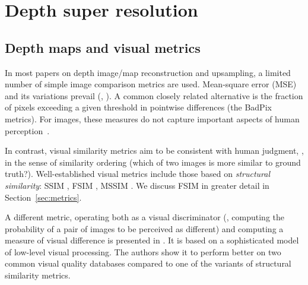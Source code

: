\section{Depth super resolution}
\label{sec:related}

\subsection{Depth maps and visual metrics}

In most papers on depth image/map reconstruction and upsampling, a limited number of simple image comparison metrics are used.  Mean-square error (MSE) and its variations prevail (\eg, \cite{eigen2014depth,honauer2015hci, honauer2016dataset,honauer2016benchmark}). A common closely related alternative is the fraction of pixels exceeding a given threshold in pointwise differences (the BadPix metrics). For images, these measures do not capture important aspects of human perception~\cite{wang2009mean}.

In contrast, visual similarity metrics aim to be consistent with human judgment, \eg, in the sense of similarity ordering
(which of two images is more similar to ground truth?). 
Well-established visual metrics include those based on \emph{structural similarity}:  SSIM \cite{wang2004image},
FSIM \cite{zhang2011fsim}, MSSIM \cite{wang2003multiscale}. 
We discuss FSIM in greater detail in Section~\ref{sec:metrics}.

A different metric, operating both as a visual discriminator (\ie, computing the probability
of a pair of images to be perceived as different) and computing a measure of visual difference is
presented in \cite{mantiuk2011hdr}.  It is based on a sophisticated model of low-level visual processing.
The authors show it to perform better on two common visual quality databases compared to one
of the variants of structural similarity metrics. 


